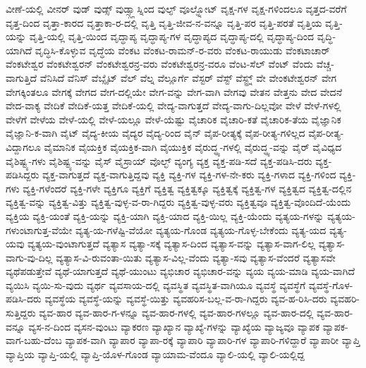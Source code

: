 {ವೀಣೆ-ಯಲ್ಲಿ
ವೀನರ್
ವುಡ್
ವುಡ್ಸ್
ವುಡ್ಸ್ಗ್ಲಾಸ್ನಿಂದ
ವುಲ್ಫ್
ವೂಲ್ಫ್ನೋಟ್
ವೃಕ್ಷ-ಗಳ
ವೃಕ್ಷ-ಗಳಿಂದಲೂ
ವೃತ್ತದ-ವರೆಗೆ
ವೃತ್ತ-ದಿಂದ
ವೃತ್ತಾ-ಕಾರದ
ವೃತ್ತಾಕಾ-ರ-ದಲ್ಲಿ
ವೃತ್ತಿ
ವೃತ್ತಿ-ಜೀವ-ನ-ವನ್ನೂ
ವೃತ್ತಿ-ಪರ
ವೃತ್ತಿ-ಪರತೆ
ವೃತ್ತಿಯ
ವೃತ್ತಿ-ಯನ್ನು
ವೃತ್ತಿ-ಯಲ್ಲಿ
ವೃತ್ತಿ-ಯಿಂದ
ವೃದ್ಧಾಪ್ಯ
ವೃದ್ಧಾಪ್ಯ-ಗಳ
ವೃದ್ಧಾಪ್ಯದ
ವೃದ್ಧಾಪ್ಯ-ದಲ್ಲಿ
ವೃದ್ಧಾಪ್ಯ-ದಿಂದ
ವೃದ್ಧಿ-ಯಾಗಿದೆ
ವೃದ್ಧಿಸಿ-ಕೊಳ್ಳುವ
ವೃದ್ಧೆಯ
ವೆಂಕಟ
ವೆಂಕಟ-ರಾಮನ್-ರ-ವರು
ವೆಂಕಟ-ರಾಯುಡು
ವೆಂಕಟಾಚಾರ್
ವೆಂಕಟೇಶ್ವರ
ವೆಂಕಟೇಶ್ವರನ್
ವೆಂಕಟೇಶ್ವರನ್ರ-ವರು
ವೆಂಕಟೇಶ್ವರನ್ರ-ವರೂ
ವೆಂಟ-ಸೆಲ್
ವೆಂಟ್
ವೆಂದು
ವೆಚ್ಚ-ವಾಗುತ್ತಿದೆ
ವೆನಿಸಿದೆ
ವೆನಿಸ್
ವೆಬ್ಸೈಟ್
ವೆಲ್
ವೆಲ್ನ
ವೆಲ್ಲೂರ್ಗೆ
ವೆಸ್ಟರ್
ವೆಸ್ಟ್
ವೆಸ್ಟ್ರ್ನ್
ವೇ
ವೇಂಕಟೇಶ್ವರನ್
ವೇಗ
ವೇಗಕ್ಕಿಂತಲೂ
ವೇಗಕ್ಕೆ
ವೇಗದ
ವೇಗ-ದಲ್ಲಿಯೇ
ವೇಗ-ವನ್ನು
ವೇಗ-ವಾಗಿ
ವೇಗವು
ವೇತನ
ವೇತ್ತನು
ವೇದ
ವೇದನೆ
ವೇದ-ವಾಕ್ಯ
ವೇದಿಕೆ
ವೇದಿಕೆ-ಯತ್ತ
ವೇದಿಕೆ-ಯಲ್ಲಿ
ವೇದ್ಯ-ವಾಗುತ್ತದೆ
ವೇದ್ಯ-ವಾಗು-ದಿಲ್ಲವೋ
ವೇಳೆ
ವೇಳೆ-ಗಳಲ್ಲಿ
ವೇಳೆಗೆ
ವೇಳೆಯ
ವೇಳೆ-ಯಲ್ಲಿ
ವೇಳೆ-ಯಲ್ಲೂ
ವೇಳೆ-ಯೆಷ್ಟು
ವೈಚಾರಿಕ
ವೈಚಾರಿ-ಕತೆ
ವೈಚಾರಿಕ-ತೆಯ
ವೈಜ್ಞಾನಿಕ
ವೈಜ್ಞಾನಿ-ಕ-ವಾಗಿ
ವೈಟ್
ವೈದ್ಯ-ಕೀಯ
ವೈದ್ಯರ
ವೈದ್ಯ-ರಿಂದ
ವೈನ್
ವೈಪ-ರೀತ್ಯಕ್ಕೆ
ವೈಪ-ರೀತ್ಯ-ಗಳಿಲ್ಲದ
ವೈಪ-ರೀತ್ಯ-ವಿದ್ದಾಗಲೂ
ವೈಮಾನಿಕ
ವೈಯಕ್ತಿಕ
ವೈಯಕ್ತಿಕ-ವಾಗಿ
ವೈಯುಕ್ತಿಕ
ವೈರುದ್ಧ್ಯ-ಗಳಲ್ಲಿ
ವೈರುದ್ಧ್ಯ-ವನ್ನು
ವೈರ್
ವೈವಿಧ್ಯದ
ವೈಶಿಷ್ಟ್ಯ-ಗಳು
ವೈಶಿಷ್ಟ್ಯ-ವನ್ನು
ವೈಸ್
ವೈಸ್ರಾಯ್
ವೊಲ್ಛ್
ವ್ಯಂಗ್ಯ
ವ್ಯಕ್ತ
ವ್ಯಕ್ತ-ಪಡಿ-ಸದೆ
ವ್ಯಕ್ತ-ಪಡಿಸಿ-ದರು
ವ್ಯಕ್ತ-ಪಡಿಸಿದ್ದರು
ವ್ಯಕ್ತ-ವಾಗುತ್ತದೆ
ವ್ಯಕ್ತ-ವಾಗುತ್ತಿದ್ದವು
ವ್ಯಕ್ತಿ
ವ್ಯಕ್ತಿ-ಗಳ
ವ್ಯಕ್ತಿ-ಗಳ-ನೇ-ಕರು
ವ್ಯಕ್ತಿ-ಗಳಾದ
ವ್ಯಕ್ತಿ-ಗಳಿಂದ
ವ್ಯಕ್ತಿ-ಗಳು
ವ್ಯಕ್ತಿ-ಗಳೆಂದರೆ
ವ್ಯಕ್ತಿ-ಗಳೇ
ವ್ಯಕ್ತಿಗೂ
ವ್ಯಕ್ತಿಗೆ
ವ್ಯಕ್ತಿತ್ವ
ವ್ಯಕ್ತಿತ್ವಕ್ಕೂ
ವ್ಯಕ್ತಿತ್ವಕ್ಕೆ
ವ್ಯಕ್ತಿತ್ವ-ಗಳ
ವ್ಯಕ್ತಿತ್ವದ
ವ್ಯಕ್ತಿತ್ವ-ದಲ್ಲಿನ
ವ್ಯಕ್ತಿತ್ವ-ವನ್ನು
ವ್ಯಕ್ತಿತ್ವ-ವಿತ್ತು
ವ್ಯಕ್ತಿತ್ವ-ವುಳ್ಳ-ವ-ರಾ-ಗಿದ್ದರು
ವ್ಯಕ್ತಿತ್ವ-ವುಳ್ಳ-ವರು
ವ್ಯಕ್ತಿತ್ವವೂ
ವ್ಯಕ್ತಿತ್ವ-ವೊಂದಿದೆ-ಯೆಂದು
ವ್ಯಕ್ತಿಯ
ವ್ಯಕ್ತಿ-ಯಂತೆ
ವ್ಯಕ್ತಿ-ಯನ್ನು
ವ್ಯಕ್ತಿ-ಯಾಗಿ
ವ್ಯಕ್ತಿ-ಯಾದ
ವ್ಯಕ್ತಿ-ಯಿಲ್ಲ
ವ್ಯಕ್ತಿ-ಯೆಂದು
ವ್ಯತ್ಯಯ-ಗಳನ್ನು
ವ್ಯತ್ಯಯ-ಗಳುಂಟಾಗುತ್ತ-ವೆಯೇ
ವ್ಯತ್ಯ-ಯ-ಗಳೆಷ್ಟಿ-ವೆಯೋ
ವ್ಯತ್ಯಯ-ಗೊಂಡ
ವ್ಯತ್ಯಯ-ಗೊಳ್ಳ-ಬೇಕೆಂದು
ವ್ಯತ್ಯ-ಯದ
ವ್ಯತ್ಯ-ಯವು
ವ್ಯತ್ಯಯ-ವುಂಟಾಗುತ್ತದೆ
ವ್ಯತ್ಯಾಸ
ವ್ಯತ್ಯಾ-ಸಕ್ಕೆ
ವ್ಯತ್ಯಾಸ-ದಿಂದ
ವ್ಯತ್ಯಾಸ-ವನ್ನು
ವ್ಯತ್ಯಾಸ-ವಾಗ-ಲಿಲ್ಲ
ವ್ಯತ್ಯಾಸ-ವಾಗು-ವು-ದಿಲ್ಲ
ವ್ಯತ್ಯಾಸ-ವಿ-ರುವಂತಾ-ಯಿತು
ವ್ಯತ್ಯಾಸ-ವಿಲ್ಲ-ವೆಂದು
ವ್ಯತ್ಯಾ-ಸವು
ವ್ಯತ್ಯಾಸ-ವೆಂದರೆ
ವ್ಯತ್ಯಾಸವೇ
ವ್ಯಥೆಪಡುತ್ತೇವೆ
ವ್ಯಥೆ-ಯಾಗುತ್ತದೆ
ವ್ಯಥೆ-ಯುಂಟು
ವ್ಯಭಿಚಾರ
ವ್ಯಭಿಚಾರ-ವನ್ನು
ವ್ಯಯ
ವ್ಯಯ-ಮಾಡಿ
ವ್ಯಯ-ವಾಗಿದೆ
ವ್ಯಯಿಸಿ
ವ್ಯಯಿ-ಸು-ವುದು
ವ್ಯರ್ಥ
ವ್ಯವಸಾಯ-ದಲ್ಲಿ
ವ್ಯವಸ್ಥಿತ
ವ್ಯವಸ್ಥಿತ-ವಾಗಿಯೂ
ವ್ಯವಸ್ಥೆ
ವ್ಯವಸ್ಥೆಗೆ
ವ್ಯವಸ್ಥೆ-ಗೊಳ-ಪಡಿಸಿ-ದರು
ವ್ಯವಸ್ಥೆಯ
ವ್ಯವಸ್ಥೆ-ಯನ್ನು
ವ್ಯವಸ್ಥೆ-ಯಿತ್ತು
ವ್ಯವಹರಿಸ-ಬಲ್ಲ-ವ-ರಾ-ಗಿದ್ದರು
ವ್ಯವ-ಹ-ರಿಸಿ-ದರು
ವ್ಯವಹರಿ-ಸುತ್ತಿದ್ದರು
ವ್ಯವ-ಹಾರ
ವ್ಯವ-ಹಾರ-ಗ-ಳನ್ನೂ
ವ್ಯವ-ಹಾರ-ಗಳಲ್ಲಿ
ವ್ಯವ-ಹಾರ-ಗಳಲ್ಲೂ
ವ್ಯವ-ಹಾರ-ದಲ್ಲಿ
ವ್ಯವ-ಹಾರ-ವನ್ನೂ
ವ್ಯಸ-ನ-ದಿಂದ
ವ್ಯಸನ-ವುಂಟು
ವ್ಯಾಕರಣ
ವ್ಯಾಖ್ಯಾನ
ವ್ಯಾಖ್ಯೆ-ಗಳನ್ನು
ವ್ಯಾಖ್ಯೆಯ
ವ್ಯಾಜ್ಯವೂ
ವ್ಯಾಪಕ
ವ್ಯಾಪಕ-ವಾಗ-ಬಹು-ದೆಂಬ
ವ್ಯಾಪಕ-ವಾಗಿ
ವ್ಯಾಪಾರ
ವ್ಯಾಪಾ-ರಕ್ಕೆ
ವ್ಯಾಪಾರಿ
ವ್ಯಾಪಾರಿ-ಗಳ
ವ್ಯಾಪಾರಿ-ಗಳಿದ್ದಾರೆ
ವ್ಯಾಪಾರೀ
ವ್ಯಾಪ್ತಿ
ವ್ಯಾಪ್ತಿಯ
ವ್ಯಾಪ್ತಿ-ಯಲ್ಲಿ
ವ್ಯಾಪ್ತಿ-ಯೊಳ-ಗೊಂಡ
ವ್ಯಾಯಾಮ-ವೆಂದೂ
ವ್ಯಾಲಿ-ಯಲ್ಲಿ
ವ್ಯಾಲಿ-ಯಲ್ಲಿದ್ದ
}
